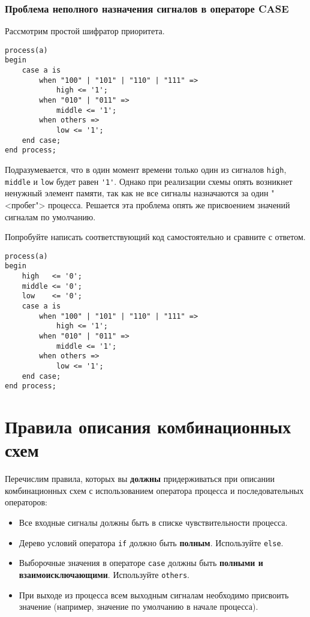 \subsubsection{Проблема неполного назначения сигналов в операторе CASE}

Рассмотрим простой шифратор приоритета.

\begin{Code}
\begin{lstlisting}
process(a)
begin
    case a is
        when "100" | "101" | "110" | "111" =>
            high <= '1';
        when "010" | "011" =>
            middle <= '1';
        when others =>
            low <= '1';
    end case;
end process;
\end{lstlisting}
\end{Code}

Подразумевается, что в один момент времени только один из сигналов \lstinline?high?, \lstinline?middle? и \lstinline?low? будет равен \lstinline?'1'?. Однако при реализации схемы опять возникнет ненужный элемент памяти, так как не все сигналы назначаются за один "<пробег"> процесса. Решается эта проблема опять же присвоением значений сигналам по умолчанию.

 Попробуйте написать соответствующий код самостоятельно и сравните с ответом.


\begin{Code}
\begin{lstlisting}
process(a)
begin
    high   <= '0';
    middle <= '0';
    low    <= '0';
    case a is
        when "100" | "101" | "110" | "111" =>
            high <= '1';
        when "010" | "011" =>
            middle <= '1';
        when others =>
            low <= '1';
    end case;
end process;
\end{lstlisting}
\end{Code}

\section{Правила описания комбинационных схем}
Перечислим правила, которых вы \textbf{должны} придерживаться при описании комбинационных схем с использованием оператора процесса и последовательных операторов:
\begin{itemize}
\item Все входные сигналы должны быть в списке чувствительности процесса.
\item Дерево условий оператора \lstinline?if? должно быть \textbf{полным}. Используйте \lstinline?else?.
\item Выборочные значения в операторе \lstinline?case? должны быть \textbf{полными и взаимоисключающими}. Используйте \lstinline?others?.
\item При выходе из процесса всем выходным сигналам необходимо присвоить значение (например, значение по умолчанию в начале процесса).
\end{itemize}

